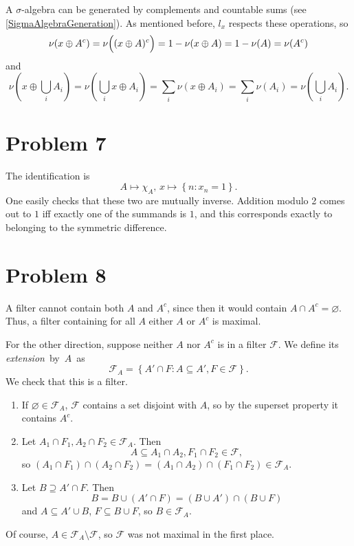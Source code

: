 A \( \sigma \)-algebra can be generated by complements and countable sums (see \ref{SigmaAlgebraGeneration}). As mentioned before, \( l_x \) respects these operations, so
\[ 
    \nu(x\oplus A^c) = \nu \Bigl( (x \oplus A)^c \Bigr) = 1 - \nu(x \oplus A) = 1 - \nu(A) = \nu(A^c) 
\]
and
\[ 
    \nu \left( x \oplus \bigcup_i A_i \right) = \nu \left( \bigcup_i x \oplus A_i \right) = \sum_i \nu(x \oplus A_i) = \sum_i \nu(A_i) = \nu \left( \bigcup_i A_i \right).
\]

\section*{Problem 7}

The identification is
\[ 
    A \mapsto \chi_A,\, x \mapsto \left\{ n: x_n = 1 \right\}.
\]
One easily checks that these two are mutually inverse. Addition modulo 2 comes out to \( 1 \) iff exactly one of the summands is \( 1 \), and this corresponds exactly to belonging to the symmetric difference.

\section*{Problem 8}

A filter cannot contain both \( A \) and \( A^c \), since then it would contain \( A \cap A^c = \varnothing \). Thus, a filter containing for all \( A \) either \( A \) or \( A^c \) is maximal.

For the other direction, suppose neither \( A \) nor \( A^c \) is in a filter \( \mathcal{F} \). We define its \emph{extension}~by~\( A \)~as
\[ 
    \mathcal{F}_A = \left\{ A' \cap F : A \subseteq A', F \in \mathcal{F} \right\}.
\]
We check that this is a filter.
\begin{enumerate}
    \item If \( \varnothing \in \mathcal{F}_A \), \( \mathcal{F} \) contains a set disjoint with \( A \), so by the superset property it contains \( A^c \).
    \item Let \( A_1 \cap F_1, A_2 \cap F_2 \in \mathcal{F}_A \). Then
    \[ 
    A \subseteq A_1 \cap A_2, F_1 \cap F_2 \in \mathcal{F},
   \]
   so \( (A_1 \cap F_1) \cap (A_2 \cap F_2) = (A_1 \cap A_2) \cap (F_1 \cap F_2) \in \mathcal{F}_A \).
\item Let \( B \supseteq A' \cap F \). Then
    \[ 
       B = B \cup (A' \cap F) = (B \cup A') \cap (B \cup F)
   \]
   and \( A \subseteq A' \cup B \), \( F \subseteq B \cup F \), so \( B \in \mathcal{F}_A \).
\end{enumerate}
Of course, \( A \in \mathcal{F}_A \setminus \mathcal{F} \), so \( \mathcal{F} \) was not maximal in the first place.


